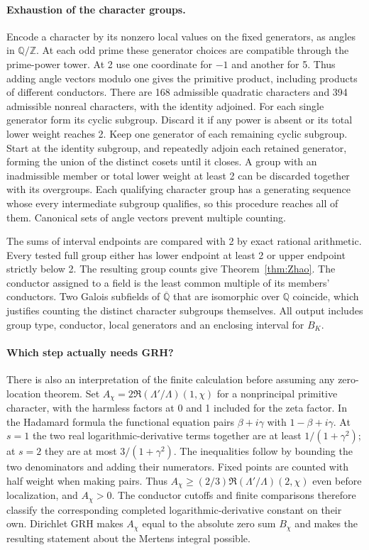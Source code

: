 \documentclass[11pt]{article}
\begin{document}
\paragraph{Exhaustion of the character groups.}
Encode a character by its nonzero local values on the fixed generators, as angles in $\mathbb Q/\mathbb Z$. At each odd prime these generator choices are compatible through the prime-power tower. At 2 use one coordinate for $-1$ and another for 5. Thus adding angle vectors modulo one gives the primitive product, including products of different conductors. There are 168 admissible quadratic characters and 394 admissible nonreal characters, with the identity adjoined. For each single generator form its cyclic subgroup. Discard it if any power is absent or its total lower weight reaches 2. Keep one generator of each remaining cyclic subgroup. Start at the identity subgroup, and repeatedly adjoin each retained generator, forming the union of the distinct cosets until it closes. A group with an inadmissible member or total lower weight at least 2 can be discarded together with its overgroups. Each qualifying character group has a generating sequence whose every intermediate subgroup qualifies, so this procedure reaches all of them. Canonical sets of angle vectors prevent multiple counting.

The sums of interval endpoints are compared with 2 by exact rational arithmetic. Every tested full group either has lower endpoint at least 2 or upper endpoint strictly below 2. The resulting group counts give Theorem~\ref{thm:Zhao}. The conductor assigned to a field is the least common multiple of its members' conductors. Two Galois subfields of $\overline{\mathbb Q}$ that are isomorphic over $\mathbb Q$ coincide, which justifies counting the distinct character subgroups themselves. All output includes group type, conductor, local generators and an enclosing interval for $B_K$.

\paragraph{Which step actually needs GRH?}
There is also an interpretation of the finite calculation before assuming any zero-location theorem. Set $A_\chi=2\Re(\Lambda'/\Lambda)(1,\chi)$ for a nonprincipal primitive character, with the harmless factors at 0 and 1 included for the zeta factor. In the Hadamard formula the functional equation pairs $\beta+i\gamma$ with $1-\beta+i\gamma$. At $s=1$ the two real logarithmic-derivative terms together are at least $1/(1+\gamma^2)$; at $s=2$ they are at most $3/(1+\gamma^2)$. The inequalities follow by bounding the two denominators and adding their numerators. Fixed points are counted with half weight when making pairs. Thus $A_\chi\ge(2/3)\Re(\Lambda'/\Lambda)(2,\chi)$ even before localization, and $A_\chi>0$. The conductor cutoffs and finite comparisons therefore classify the corresponding completed logarithmic-derivative constant on their own. Dirichlet GRH makes $A_\chi$ equal to the absolute zero sum $B_\chi$ and makes the resulting statement about the Mertens integral possible.
\end{document}

